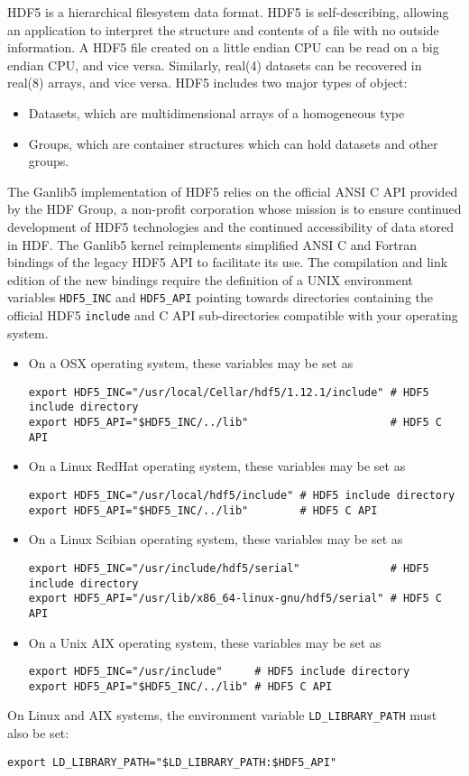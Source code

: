 HDF5 is a hierarchical filesystem data format. HDF5 is self-describing, allowing an application to interpret the structure and contents
of a file with no outside information. A HDF5 file created on a little endian CPU can be read on a big endian CPU, and vice versa.
Similarly, real(4) datasets can be recovered in real(8) arrays, and vice versa. HDF5 includes two major types of object:
\begin{itemize}
\item Datasets, which are multidimensional arrays of a homogeneous type
\item Groups, which are container structures which can hold datasets and other groups.
\end{itemize}
The Ganlib5 implementation of HDF5 relies on the official ANSI C API provided by the HDF Group, a non-profit corporation whose mission
is to ensure continued development of HDF5 technologies and the continued accessibility of data stored in HDF. The Ganlib5 kernel
reimplements simplified ANSI C and Fortran bindings of the legacy HDF5 API to facilitate its use. The compilation and link edition of the
new bindings require the definition of a UNIX environment variables {\tt HDF5\_INC} and {\tt HDF5\_API} pointing towards directories containing
the official HDF5 {\tt include} and C API sub-directories compatible with your operating system. 

\begin{itemize}
\item On a OSX operating system, these variables may be set as
\begin{verbatim}
export HDF5_INC="/usr/local/Cellar/hdf5/1.12.1/include" # HDF5 include directory
export HDF5_API="$HDF5_INC/../lib"                      # HDF5 C API
\end{verbatim}
\item On a Linux RedHat operating system, these variables may be set as
\begin{verbatim}
export HDF5_INC="/usr/local/hdf5/include" # HDF5 include directory
export HDF5_API="$HDF5_INC/../lib"        # HDF5 C API
\end{verbatim}
\item On a Linux Scibian operating system, these variables may be set as
\begin{verbatim}
export HDF5_INC="/usr/include/hdf5/serial"              # HDF5 include directory
export HDF5_API="/usr/lib/x86_64-linux-gnu/hdf5/serial" # HDF5 C API
\end{verbatim}
\item On a Unix AIX operating system, these variables may be set as
\begin{verbatim}
export HDF5_INC="/usr/include"     # HDF5 include directory
export HDF5_API="$HDF5_INC/../lib" # HDF5 C API
\end{verbatim}
\end{itemize}
On Linux and AIX systems, the environment variable {\tt LD\_LIBRARY\_PATH} must also be set:
\begin{verbatim}
export LD_LIBRARY_PATH="$LD_LIBRARY_PATH:$HDF5_API"
\end{verbatim}

